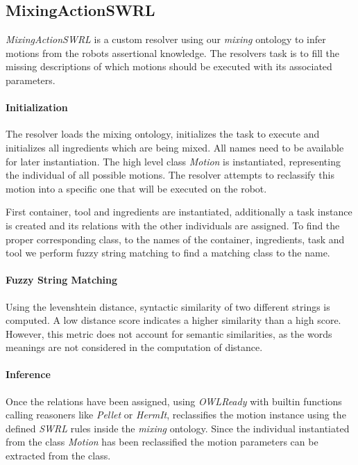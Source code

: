 \subsection{MixingActionSWRL}
\label{subsection:MixingActionSWRL}
\textit{MixingActionSWRL} is a custom resolver using our \textit{mixing} ontology to infer motions from the robots assertional knowledge.
The resolvers task is to fill the missing descriptions of which motions should be executed with its associated parameters.

\paragraph{Initialization}
The resolver loads the mixing ontology, initializes the task to execute and initializes all ingredients which are being mixed. 
All names need to be available for later instantiation.
The high level class \textit{Motion} is instantiated, representing the individual of all possible motions. 
The resolver attempts to reclassify this motion into a specific one that will be executed on the robot.

First container, tool and ingredients are instantiated, additionally a task instance is created and its relations with 
the other individuals are assigned. To find the proper corresponding class, to the names of the container, ingredients, task and tool
we perform fuzzy string matching to find a matching class to the name. 

\paragraph{Fuzzy String Matching}
Using the levenshtein distance, syntactic similarity of two different strings is computed. A low distance score
indicates a higher similarity than a high score. However, this metric does not account for semantic similarities, 
as the words meanings are not considered in the computation of distance.

\paragraph{Inference}
Once the relations have been assigned, using \textit{OWLReady} with builtin functions calling reasoners like \textit{Pellet} or \textit{HermIt},
reclassifies the motion instance using the defined \textit{SWRL} rules inside the \textit{mixing} ontology.
Since the individual instantiated from the class \textit{Motion} has been reclassified the motion parameters can be extracted from the class.

